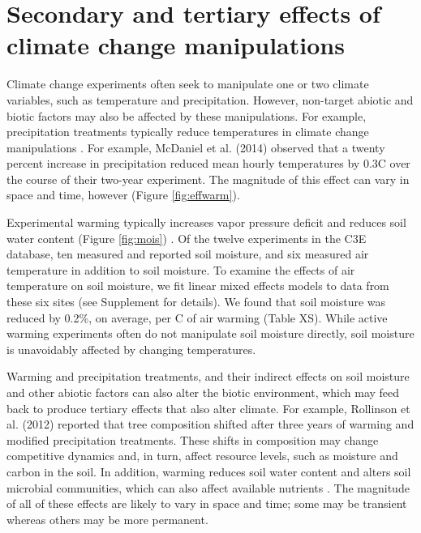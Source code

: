 \documentclass{article}
\begin{document}
\section* {Secondary and tertiary effects of climate change manipulations} 
Climate change experiments often seek to manipulate one or two climate variables, such as temperature and precipitation. However, non-target abiotic and biotic factors may also be affected by these manipulations. For example, precipitation treatments typically reduce temperatures in climate change manipulations \citep{sherry2007,rollinson2012,mcdaniel2014}. For example, McDaniel et al. (2014) observed that a twenty percent increase in precipitation reduced mean hourly temperatures by 0.3\degree C over the course of their two-year experiment. The magnitude of this effect can vary in space and time, however (Figure \ref{fig:effwarm}). 
\par Experimental warming typically increases vapor pressure deficit and reduces soil water content (Figure \ref{fig:mois}) \citep[e.g.,][]{sherry2007,morin2010,templer2016}. Of the twelve experiments in the C3E database, ten measured and reported soil moisture, and six measured air temperature in addition to soil moisture. To examine the effects of air temperature on soil moisture, we fit linear mixed effects models to data from these six sites (see Supplement for details). We found that soil moisture was reduced by 0.2\%, on average, per \degree C of air warming (Table XS). While active warming experiments often do not manipulate soil moisture directly, soil moisture is unavoidably affected by changing temperatures. 

\par Warming and precipitation treatments, and their indirect effects on soil moisture and other abiotic factors can also alter the biotic environment, which may feed back to produce tertiary effects that also alter climate. For example, Rollinson et al. (2012) reported that tree composition shifted after three years of warming and modified precipitation treatments. These shifts in composition may change competitive dynamics and, in turn, affect resource levels, such as moisture and carbon in the soil\citep{harte2015}. In addition, warming reduces soil water content and alters soil microbial communities, which can also affect available nutrients \citep{mcdaniel2014,mcdaniel2014b}. The magnitude of all of these effects are likely to vary in space and time; some may be transient whereas others may be more permanent.
\end{document}
